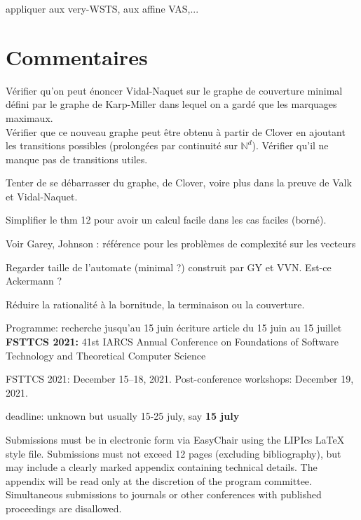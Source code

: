\documentclass[a4paper,final]{article}
\theoremstyle{definition}
\newcommand{\N}{\ensuremath{\mathbb{N}}}
\begin{document}
appliquer aux very-WSTS, aux affine VAS,...

\section{Commentaires}
Vérifier qu'on peut énoncer Vidal-Naquet sur le graphe de couverture minimal défini par le graphe de Karp-Miller dans lequel on a gardé que les marquages maximaux.\\
Vérifier que ce nouveau graphe peut être obtenu à partir de Clover en ajoutant les transitions possibles (prolongées par continuité sur $\N^d$). Vérifier qu'il ne manque pas de transitions utiles.

Tenter de se débarrasser du graphe, de Clover, voire plus dans la preuve de Valk et Vidal-Naquet.

Simplifier le thm 12 pour avoir un calcul facile dans les cas faciles (borné).

Voir Garey, Johnson : référence pour les problèmes de complexité sur les vecteurs

Regarder taille de l'automate (minimal ?) construit par GY et VVN. Est-ce Ackermann ?

Réduire la rationalité à la bornitude, la terminaison ou la couverture.

Programme:
recherche jusqu'au 15 juin
écriture article du 15 juin au 15 juillet \\

{\bf FSTTCS 2021:}  
41st IARCS Annual Conference on
Foundations of Software Technology and Theoretical Computer Science

    FSTTCS 2021: December 15–18, 2021.
    Post-conference workshops: December 19, 2021.

deadline: unknown but usually 15-25 july, say {\bf 15 july}

Submissions must be in electronic form via EasyChair using the LIPIcs LaTeX style file. Submissions must not exceed 12 pages (excluding bibliography), but may include a clearly marked appendix containing technical details. The appendix will be read only at the discretion of the program committee. Simultaneous submissions to journals or other conferences with published proceedings are disallowed. 

\printbibliography


\end{document}
